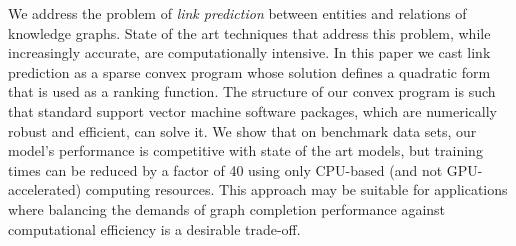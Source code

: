 We address the problem of {\em link prediction} between entities and relations of knowledge graphs.  State of the art techniques that address this problem, while increasingly accurate, are computationally intensive.  In this paper we cast link prediction as a {sparse} {convex program} whose solution defines a quadratic form that is used as a ranking function. The structure of our convex program is such that standard support vector machine software packages, which are numerically robust and efficient, can solve it. We show that on benchmark data sets, our model's performance is competitive with state of the art models, but training times can be reduced by a factor of 40 using only CPU-based (and not GPU-accelerated) computing resources.  This approach may be suitable for applications where balancing the demands of graph completion performance against computational efficiency is a desirable trade-off.
